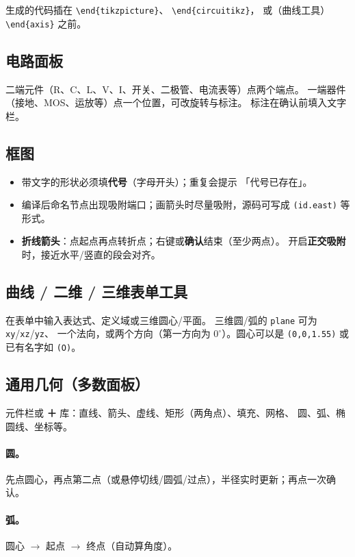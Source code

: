 \documentclass[a4paper]{ltxdoc}
\newcommand{\ui}[1]{\textbf{#1}}
\begin{document}
生成的代码插在
\texttt{\textbackslash end\{tikzpicture\}}、
\texttt{\textbackslash end\{circuitikz\}}，
或（曲线工具）\texttt{\textbackslash end\{axis\}} 之前。

\subsection{电路面板}
二端元件（R、C、L、V、I、开关、二极管、电流表等）点两个端点。
一端器件（接地、MOS、运放等）点一个位置，可改旋转与标注。
标注在确认前填入文字栏。

\subsection{框图}
\begin{itemize}[nosep]
  \item 带文字的形状必须填\textbf{代号}（字母开头）；重复会提示
        「代号已存在」。
  \item 编译后命名节点出现吸附端口；画箭头时尽量吸附，源码可写成
        \texttt{(id.east)} 等形式。
  \item \ui{折线箭头}：点起点再点转折点；右键或\ui{确认}结束（至少两点）。
        开启\ui{正交吸附}时，接近水平/竖直的段会对齐。
\end{itemize}

\subsection{曲线 / 二维 / 三维表单工具}
在表单中输入表达式、定义域或三维圆心/平面。
三维圆/弧的 \texttt{plane} 可为 \texttt{xy}/\texttt{xz}/\texttt{yz}、
一个法向，或两个方向（第一方向为 $0^\circ$）。圆心可以是
\texttt{(0,0,1.55)} 或已有名字如 \texttt{(O)}。

\subsection{通用几何（多数面板）}
元件栏或 \ui{＋} 库：直线、箭头、虚线、矩形（两角点）、填充、网格、
圆、弧、椭圆线、坐标等。

\paragraph{圆。}
先点圆心，再点第二点（或悬停切线/圆弧/过点），半径实时更新；再点一次确认。

\paragraph{弧。}
圆心 $\rightarrow$ 起点 $\rightarrow$ 终点（自动算角度）。
\end{document}
